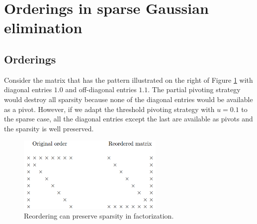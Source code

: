\section{Orderings in sparse Gaussian elimination}
\label{sec:OrderingInSparse}

\subsection{Orderings}
\label{sec:orderings}

\begin{exm}
  \label{exm:reordering}
  Consider the matrix that has the pattern illustrated on the right of
  Figure \ref{fig:ReorderingSparse} with diagonal entries $1.0$ and
  off-diagonal entries $1.1$. The partial pivoting strategy would
  destroy all sparsity because none of the diagonal entries would be
  available as a pivot. However, if we adapt the threshold pivoting
  strategy with $u=0.1$ to the sparse case,  all the
  diagonal entries except the last are available as pivots and the
  sparsity is well preserved.

  \begin{figure}[H]
    \centering
    \includegraphics[width=7cm]{png/ReorderingSparse.png}
    \caption{Reordering can preserve sparsity in factorization.}
    \label{fig:ReorderingSparse}
  \end{figure}
\end{exm}

